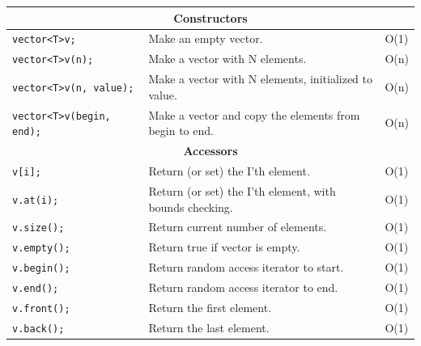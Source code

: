 \documentclass[12 pt, twoside] {article}
\begin{document}
{\begin{table}[h]
\centering
\begin{tabular}{|l|l|l|}
\hline
\multicolumn{3}{|c|}{\textbf{Constructors}}                                                                              \\ \hline
\texttt{vector\textless T\textgreater v;}             & Make an empty vector.                                   & O(1)             \\ \hline
\texttt{vector\textless T\textgreater v(n);}          & Make a vector with N elements.                          & O(n)             \\ \hline
\texttt{vector\textless T\textgreater v(n, value);}   & Make a vector with N elements, initialized to value.    & O(n)             \\ \hline
\texttt{vector\textless T\textgreater v(begin, end);} & Make a vector and copy the elements from begin to end.  & O(n)             \\ \hline
\multicolumn{3}{|c|}{\textbf{Accessors}}                                                                                 \\ \hline
\texttt{v{[}i{]};}                                   & Return (or set) the I'th element.                       & O(1)             \\ \hline
\texttt{v.at(i);}                                    & Return (or set) the I'th element, with bounds checking. & O(1)             \\ \hline
\texttt{v.size();}                                   & Return current number of elements.                      & O(1)             \\ \hline
\texttt{v.empty();}                                  & Return true if vector is empty.                         & O(1)             \\ \hline
\texttt{v.begin();}                                  & Return random access iterator to start.                 & O(1)             \\ \hline
\texttt{v.end();}                                    & Return random access iterator to end.                   & O(1)             \\ \hline
\texttt{v.front();}                                  & Return the first element.                               & O(1)             \\ \hline
\texttt{v.back();}                                   & Return the last element.                                & O(1)             \\ \hline

\end{tabular}
\end{table}}
\end{document}
